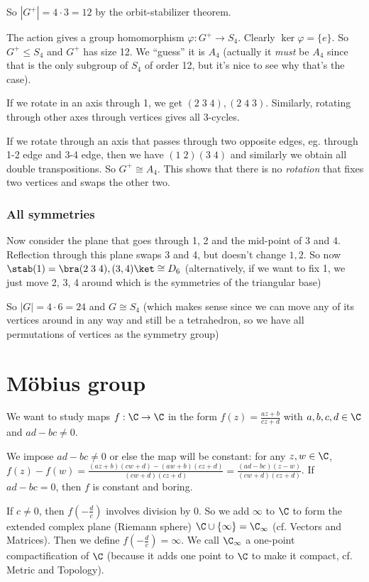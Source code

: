 \documentclass[a4paper]{article}
\begin{document}
  So $|G^+| = 4\cdot 3 = 12$ by the orbit-stabilizer theorem.

  The action gives a group homomorphism $\varphi: G^+ \to S_4$. Clearly $\ker \varphi = \{e\}$. So $G^+ \leq S_4$ and $G^+$ has size 12. We ``guess'' it is $A_4$ (actually it \emph{must} be $A_4$ since that is the only subgroup of $S_4$ of order 12, but it's nice to see why that's the case).

  If we rotate in an axis through 1, we get $(2\; 3\; 4), (2\; 4\; 3)$. Similarly, rotating through other axes through vertices gives all 3-cycles. 

  If we rotate through an axis that passes through two opposite edges, eg. through 1-2 edge and 3-4 edge, then we have $(1\; 2)(3\; 4)$ and similarly we obtain all double transpositions. So $G^+ \cong A_4$. This shows that there is no \emph{rotation} that fixes two vertices and swaps the other two. 

  \subsubsection{All symmetries}
  Now consider the plane that goes through 1, 2 and the mid-point of 3 and 4. Reflection through this plane swaps 3 and 4, but doesn't change $1, 2$. So now $\stab(1) = \bra (2\; 3\; 4), (3, 4)\ket \cong D_6$ (alternatively, if we want to fix 1, we just move 2, 3, 4 around which is the symmetries of the triangular base)

  So $|G| = 4\cdot 6 = 24$ and $G\cong S_4$ (which makes sense since we can move any of its vertices around in any way and still be a tetrahedron, so we have all permutations of vertices as the symmetry group)

  \section{M\"obius group}
  We want to study maps $f: \C \to \C$ in the form $f(z) = \frac{az + b}{cz + d}$ with $a, b, c, d\in \C$ and $ad - bc \not= 0$.

  We impose $ad - bc\not= 0$ or else the map will be constant: for any $z, w\in \C$, $f(z) - f(w) = \frac{(az + b)(cw + d) - (aw + b)(cz + d)}{(cw + d)(cz + d)} = \frac{(ad - bc)(z - w)}{(cw + d)(cz + d)}$. If $ad - bc = 0$, then $f$ is constant and boring.

  If $c\not=0$, then $f(-\frac{d}{c})$ involves division by 0. So we add $\infty$ to $\C$ to form the extended complex plane (Riemann sphere) $\C\cup \{\infty\}= \C_\infty$ (cf. Vectors and Matrices). Then we define $f(-\frac{d}{c}) = \infty$. We call $\C_\infty$ a one-point compactification of $\C$ (because it adds one point to $\C$ to make it compact, cf. Metric and Topology).
\end{document}
